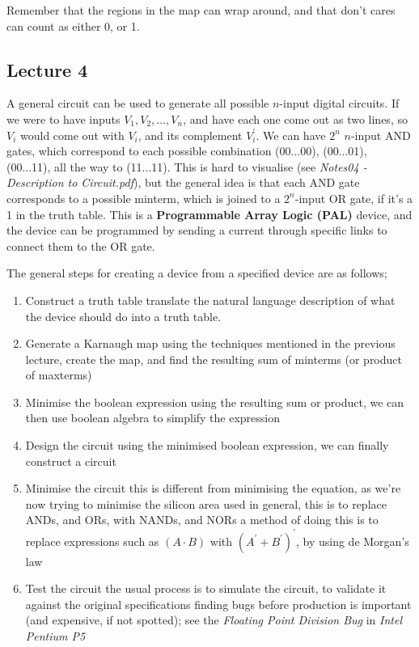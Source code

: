 \documentclass[a4paper, 12pt]{article}
\begin{document}
            Remember that the regions in the map can wrap around, and that don't cares can count as either 0, or 1.
        \subsection*{Lecture 4}
            A general circuit can be used to generate all possible $n$-input digital circuits. If we were to have inputs $V_1, V_2, ..., V_n$, and have each one come out as two lines, so $V_i$ would come out with $V_i$, and its complement $V_i^\prime$. We can have $2^n$ $n$-input AND gates, which correspond to each possible combination (00...00), (00...01), (00...11), all the way to (11...11). This is hard to visualise (see \textit{Notes04 - Description to Circuit.pdf}), but the general idea is that each AND gate corresponds to a possible minterm, which is joined to a $2^n$-input OR gate, if it's a 1 in the truth table. This is a \textbf{Programmable Array Logic (PAL)} device, and the device can be programmed by sending a current through specific links to connect them to the OR gate.
            \medskip

            The general steps for creating a device from a specified device are as follows;
            \begin{enumerate}[1.]
                \itemsep0em
                \item Construct a truth table
                    \subitem translate the natural language description of what the device should do into a truth table.
                \item Generate a Karnaugh map
                    \subitem using the techniques mentioned in the previous lecture, create the map, and find the resulting sum of minterms (or product of maxterms)
                \item Minimise the boolean expression
                    \subitem using the resulting sum or product, we can then use boolean algebra to simplify the expression
                \item Design the circuit
                    \subitem using the minimised boolean expression, we can finally construct a circuit
                \item Minimise the circuit
                    \subitem this is different from minimising the equation, as we're now trying to minimise the silicon area used
                    \subitem in general, this is to replace ANDs, and ORs, with NANDs, and NORs
                    \subitem a method of doing this is to replace expressions such as $(A \cdot B)$ with $(A^\prime + B^\prime)^\prime$, by using de Morgan's law
                \item Test the circuit
                    \subitem the usual process is to simulate the circuit, to validate it against the original specifications
                    \subitem finding bugs before production is important (and expensive, if not spotted); see the \textit{Floating Point Division Bug} in \textit{Intel Pentium P5}
            \end{enumerate}
\end{document}
